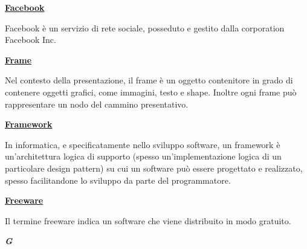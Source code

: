 \begin{addmargin}[0em]{0em}		
	\textbf{\underline{Facebook}}
\end{addmargin}
	
\medskip
\begin{addmargin}[5em]{1em}	
Facebook è un servizio di rete sociale, posseduto e gestito dalla corporation Facebook Inc.
\end{addmargin}	

\bigskip
\begin{addmargin}[0em]{0em}
	\textbf{\underline{Frame}}
\end{addmargin}

\medskip
\begin{addmargin}[5em]{1em}	
Nel contesto della presentazione, il frame è un oggetto contenitore in grado di contenere oggetti grafici, come immagini, testo e shape. Inoltre ogni frame può rappresentare un nodo del cammino presentativo.
\end{addmargin}	

\bigskip
\begin{addmargin}[0em]{0em}	
	\textbf{\underline{Framework}}
\end{addmargin}

\medskip
\begin{addmargin}[5em]{1em}	
In informatica, e specificatamente nello sviluppo software, un framework è un'architettura logica di supporto (spesso un'implementazione logica di un particolare design pattern) su cui un software può essere progettato e realizzato, spesso facilitandone lo sviluppo da parte del programmatore.
\end{addmargin}	

\bigskip
\begin{addmargin}[0em]{0em}	
	\textbf{\underline{Freeware}} 
\end{addmargin}

\medskip
\begin{addmargin}[5em]{1em}	
Il termine freeware indica un software che viene distribuito in modo gratuito.
\end{addmargin}	

\newpage

\cleardoublepage
{}
{}
\noindent\hrulefill\hspace{4mm}\textbf{\textsl{\Huge{G}}}\hspace{4mm}\hrulefill

\vspace*{2\bigskipamount}

